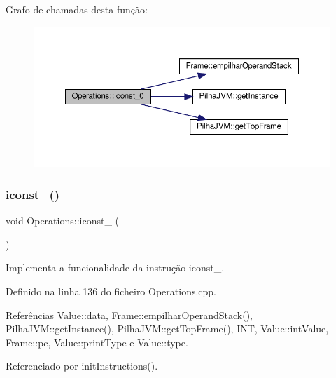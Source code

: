 Grafo de chamadas desta função\+:\nopagebreak
\begin{figure}[H]
\begin{center}
\leavevmode
\includegraphics[width=350pt]{classOperations_a89879486791daebe6659b96688465c9d_cgraph}
\end{center}
\end{figure}
\mbox{\label{classOperations_a3933ba76ead633a53683ff8491a313ea}} 
\subsubsection{\texorpdfstring{iconst\+\_()}{iconst\_1()}}
{\footnotesize\ttfamily void Operations\+::iconst\+\_ (\begin{DoxyParamCaption}{ }\end{DoxyParamCaption})\hspace{0.3cm}{\ttfamily [private]}}



Implementa a funcionalidade da instrução iconst\+\_. 



Definido na linha 136 do ficheiro Operations.\+cpp.



Referências Value\+::data, Frame\+::empilhar\+Operand\+Stack(), Pilha\+J\+V\+M\+::get\+Instance(), Pilha\+J\+V\+M\+::get\+Top\+Frame(), I\+NT, Value\+::int\+Value, Frame\+::pc, Value\+::print\+Type e Value\+::type.



Referenciado por init\+Instructions().

